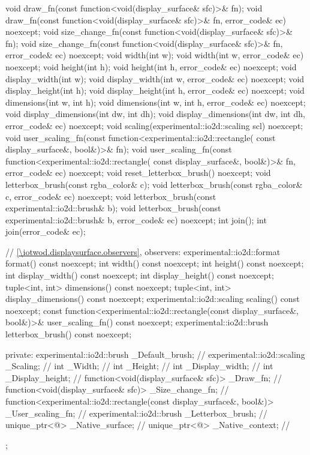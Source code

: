 \begin{codeblock}
{{{{{    void draw_fn(const function<void(display_surface& sfc)>& fn);
    void draw_fn(const function<void(display_surface& sfc)>& fn,
      error_code& ec) noexcept;
    void size_change_fn(const function<void(display_surface& sfc)>& fn);
    void size_change_fn(const function<void(display_surface& sfc)>& fn,
      error_code& ec) noexcept;
    void width(int w);
    void width(int w, error_code& ec) noexcept;
    void height(int h);
    void height(int h, error_code& ec) noexcept;
    void display_width(int w);
    void display_width(int w, error_code& ec) noexcept;
    void display_height(int h);
    void display_height(int h, error_code& ec) noexcept;
    void dimensions(int w, int h);
    void dimensions(int w, int h, error_code& ec) noexcept;
    void display_dimensions(int dw, int dh);
    void display_dimensions(int dw, int dh, error_code& ec) noexcept;
    void scaling(experimental::io2d::scaling scl) noexcept;
    void user_scaling_fn(const function<experimental::io2d::rectangle(
      const display_surface&, bool&)>& fn);
    void user_scaling_fn(const function<experimental::io2d::rectangle(
      const display_surface&, bool&)>& fn, error_code& ec) noexcept;
    void reset_letterbox_brush() noexcept;
    void letterbox_brush(const rgba_color& c);
    void letterbox_brush(const rgba_color& c, error_code& ec) noexcept;
    void letterbox_brush(const experimental::io2d::brush& b);
    void letterbox_brush(const experimental::io2d::brush& b, error_code& ec) noexcept;
    int join();
    int join(error_code& ec);
    
    // \ref{\iotwod.displaysurface.observers}, observers:
    experimental::io2d::format format() const noexcept;
    int width() const noexcept;
    int height() const noexcept;
    int display_width() const noexcept;
    int display_height() const noexcept;
    tuple<int, int> dimensions() const noexcept;
    tuple<int, int> display_dimensions() const noexcept;
    experimental::io2d::scaling scaling() const noexcept;
    const function<experimental::io2d::rectangle(const display_surface&,
      bool&)>& user_scaling_fn() const noexcept;
    experimental::io2d::brush letterbox_brush() const noexcept;

  private:
    experimental::io2d::brush _Default_brush;             // \expos
    experimental::io2d::scaling _Scaling;                 // \expos
    int _Width;                                           // \expos
    int _Height;                                          // \expos
    int _Display_width;                                   // \expos
    int _Display_height;                                  // \expos
    function<void(display_surface& sfc)> _Draw_fn;        // \expos
    function<void(display_surface& sfc)> _Size_change_fn; // \expos
    function<experimental::io2d::rectangle(const display_surface&, bool&)> 
      _User_scaling_fn;                                   // \expos
    experimental::io2d::brush _Letterbox_brush;           // \expos    
    unique_ptr<@\impdef@> _Native_surface;   // \expos
    unique_ptr<@\impdef@> _Native_context;   // \expos
  };
} } } }
\end{codeblock}

